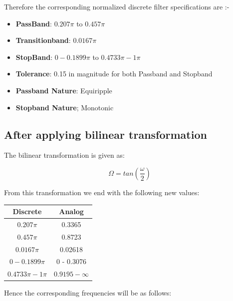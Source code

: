 \documentclass{scrartcl}
\begin{document}
Therefore the corresponding normalized discrete filter specifications are :-

\begin{itemize}

\item \textbf{PassBand}: $0.207\pi$ to $0.457\pi$

\item \textbf{Transitionband}: $0.0167\pi$

\item \textbf{StopBand}: $0 - 0.1899\pi$ to $0.4733\pi - 1\pi$

\item \textbf{Tolerance}: 0.15 in magnitude for both Passband and Stopband

\item \textbf{Passband Nature}: Equiripple

\item \textbf{Stopband Nature}; Monotonic

\end{itemize}
 
 \subsection{After applying bilinear transformation}

 The bilinear transformation is given as:

 \begin{equation}
     \Omega = tan(\frac{\omega}{2})
 \end{equation}

 \newpage

 From this transformation we end with the following new values:
\begin{table}[!h]
    \centering

\begin{tabular}{|c|c|}
\hline
Discrete & Analog \\
\hline
$0.207\pi$ & 0.3365 \\
$0.457\pi$ & 0.8723 \\
$0.0167\pi$ & 0.02618 \\
$0 - 0.1899\pi$ & 0 - 0.3076\\
$0.4733\pi - 1\pi$ & $0.9195 - \infty$ \\

\hline
\end{tabular}

\end{table}

Hence the corresponding frequencies will be as follows:
\end{document}
